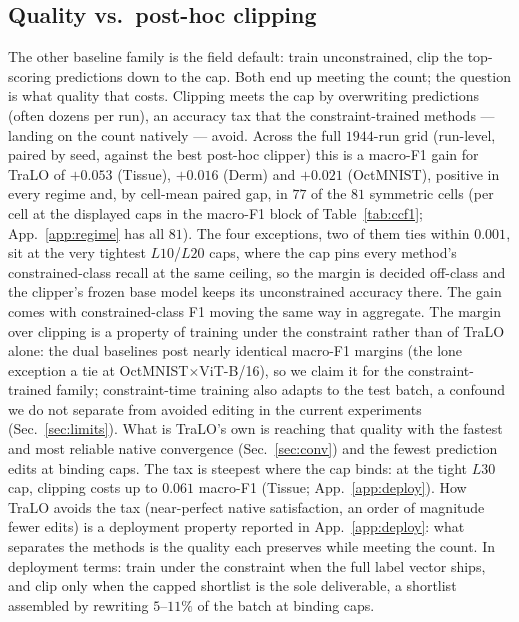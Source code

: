 \documentclass[10pt]{article}
\begin{document}
\subsection{Quality vs.\ post-hoc clipping}
\label{sec:deploy}

The other baseline family is the field default: train unconstrained, clip
the top-scoring predictions down to the cap. Both end up meeting the
count; the question is what quality that costs. Clipping meets the cap by
overwriting predictions (often dozens per run), an accuracy tax that the
constraint-trained methods --- landing on the count natively --- avoid.
Across the full $1944$-run grid (run-level, paired by seed, against the
best post-hoc clipper) this is a macro-F1 gain for TraLO of $+0.053$
(Tissue), $+0.016$ (Derm) and $+0.021$ (OctMNIST), positive in every
regime and, by cell-mean paired gap, in $77$ of the $81$ symmetric cells
(per cell at the displayed caps in the macro-F1 block of
Table~\ref{tab:ccf1}; App.~\ref{app:regime} has all $81$). The four
exceptions, two of them ties within $0.001$, sit at the very tightest
$L10$/$L20$ caps, where the cap pins every method's constrained-class
recall at the same ceiling, so the margin is decided off-class and the
clipper's frozen base model keeps its unconstrained accuracy there. The
gain comes with constrained-class F1 moving the same way in aggregate.
The margin over clipping is a property of training under the constraint
rather than of TraLO alone: the dual baselines post nearly identical
macro-F1 margins (the lone exception a tie at OctMNIST$\times$ViT{-B/16}), so we
claim it for the constraint-trained family; constraint-time training also
adapts to the test batch, a confound we do not separate from avoided
editing in the current experiments (Sec.~\ref{sec:limits}). What is
TraLO's own is reaching that quality with the fastest and most reliable
native convergence (Sec.~\ref{sec:conv}) and the fewest prediction edits
at binding caps. The tax is steepest where the cap binds: at the tight
$L30$ cap, clipping costs up to $0.061$ macro-F1 (Tissue;
App.~\ref{app:deploy}). How TraLO avoids the tax (near-perfect native
satisfaction, an order of magnitude fewer edits) is a deployment property
reported in App.~\ref{app:deploy}: what separates the methods is the
quality each preserves while meeting the count. In deployment terms:
train under the constraint when the full label vector ships, and clip only
when the capped shortlist is the sole deliverable, a shortlist assembled
by rewriting $5$--$11\%$ of the batch at binding caps.
\end{document}
